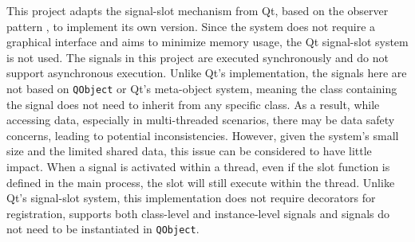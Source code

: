 \documentclass[
	english,
	ruledheaders=section,%
	class=report,%
	thesis={type=Report},%
	accentcolor=9c,%
	custommargins=true,%
	marginpar=false,%
	parskip=half-,%
	fontsize=11pt,%
	logofile={img/tuda_logo.pdf}, %
]{tudapub}
\begin{document}
This project adapts the signal-slot mechanism from Qt, based on the observer pattern \cite{DesignPatterns}, to implement its own version. Since the system does not require a graphical interface and aims to minimize memory usage, the Qt signal-slot system is not used. The signals in this project are executed synchronously and do not support asynchronous execution. Unlike Qt's implementation, the signals here are not based on \texttt{QObject} or Qt's meta-object system, meaning the class containing the signal does not need to inherit from any specific class. As a result, while accessing data, especially in multi-threaded scenarios, there may be data safety concerns, leading to potential inconsistencies. However, given the system's small size and the limited shared data, this issue can be considered to have little impact. When a signal is activated within a thread, even if the slot function is defined in the main process, the slot will still execute within the thread. Unlike Qt’s signal-slot system, this implementation does not require decorators for registration, supports both class-level and instance-level signals and signals do not need to be instantiated in \texttt{QObject}.

\end{document}
